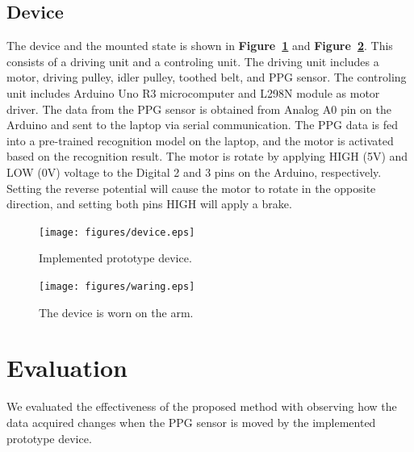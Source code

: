 \documentclass[sigconf]{acmart}
\newcommand\figref[1]{\textbf{Figure~\ref{fig:#1}}}
\begin{document}
\subsection{Device}
The device and the mounted state is shown in \figref{device} and \figref{waring}. This consists of a driving unit and a controling unit. The driving unit includes a motor, driving pulley, idler pulley, toothed belt, and PPG sensor. The controling unit includes Arduino Uno R3 microcomputer and L298N module as motor driver. The data from the PPG sensor is obtained from Analog A0 pin on the Arduino and sent to the laptop via serial communication. The PPG data is fed into a pre-trained recognition model on the laptop, and the motor is activated based on the recognition result. The motor is rotate by applying HIGH (5V) and LOW (0V) voltage to the Digital 2 and 3 pins on the Arduino, respectively. Setting the reverse potential will cause the motor to rotate in the opposite direction, and setting both pins HIGH will apply a brake.

\begin{figure}[!t]
  \centering
  \texttt{[image: figures/device.eps]}
  \caption{Implemented prototype device.}
  \label{fig:device}
\end{figure}

\begin{figure}[!t]
  \centering
  \texttt{[image: figures/waring.eps]}
  \caption{The device is worn on the arm.}
  \label{fig:waring}
\end{figure}



\section{Evaluation}
\label{sec:evaluation}
We evaluated the effectiveness of the proposed method with observing how the data acquired changes when the PPG sensor is moved by the implemented prototype device.
\end{document}
